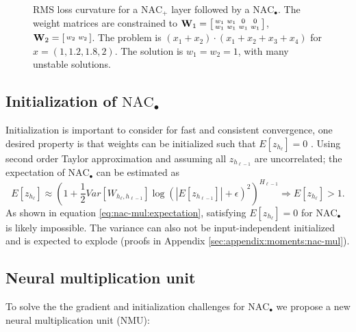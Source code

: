\begin{figure}[h]
\caption{RMS loss curvature for a $\mathrm{NAC}_{+}$ layer followed by a $\mathrm{NAC}_{\bullet}$. The weight matrices are constrained to $\mathbf{W}_1 = \left[\protect\begin{smallmatrix}
w_1 & w_1 & 0 & 0 \\
w_1 & w_1 & w_1 & w_1
\protect\end{smallmatrix}\right]$, $\mathbf{W}_2 = \left[\protect\begin{smallmatrix}
w_2 & w_2
\protect\end{smallmatrix}\right]$. The problem is $(x_1 + x_2) \cdot (x_1 + x_2 + x_3 + x_4)$ for $x = \left(1, 1.2, 1.8, 2\right)$. The solution is $w_1 = w_2 = 1$, with many unstable solutions.}
\label{fig:nac-mul-eps-issue}
\end{figure}

\subsection{Initialization of \texorpdfstring{$\mathrm{NAC}_{\bullet}$}{NAC-mul}}
Initialization is important to consider for fast and consistent convergence, one desired property is that weights can be initialized such that $E[z_{h_\ell}] = 0$ \cite{glorot-initialization}. Using second order Taylor approximation and assuming all $z_{h_{\ell-1}}$ are uncorrelated; the expectation of $\mathrm{NAC}_{\bullet}$ can be estimated as
\begin{equation}
E[z_{h_\ell}] \approx \left(1 + \frac{1}{2} Var[W_{h_\ell, h_{\ell-1}}] \log(|E[z_{h_{\ell-1}}]| + \epsilon)^2\right)^{H_{\ell-1}} \Rightarrow E[z_{h_\ell}] > 1.
\label{eq:nac-mul:expectation}
\end{equation}
As shown in equation \ref{eq:nac-mul:expectation}, satisfying $E[z_{h_\ell}] = 0$ for $\mathrm{NAC}_{\bullet}$ is likely impossible. The variance can also not be input-independent initialized and is expected to explode (proofs in Appendix \ref{sec:appendix:moments:nac-mul}).

\subsection{Neural multiplication unit}
To solve the the gradient and initialization challenges for $\mathrm{NAC}_{\bullet}$ we propose a new neural multiplication unit (NMU):

